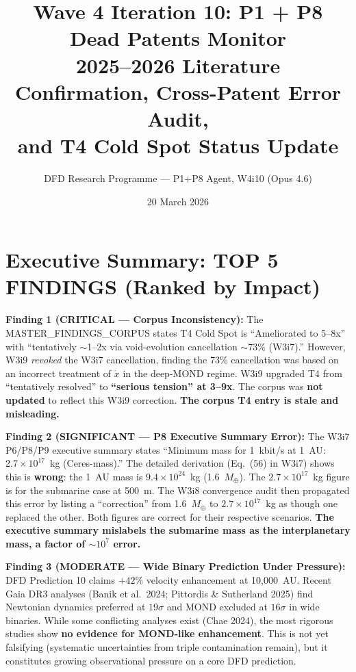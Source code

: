 \documentclass[11pt]{article}
\title{\textbf{Wave 4 Iteration 10: P1 + P8 Dead Patents Monitor}\\[0.5em]
\large 2025--2026 Literature Confirmation, Cross-Patent Error Audit,\\
and T4 Cold Spot Status Update}
\author{DFD Research Programme --- P1+P8 Agent, W4i10 (Opus 4.6)}
\date{20 March 2026}
\newcommand{\ee}[1]{\times 10^{#1}}
\begin{document}
\maketitle

\section*{Executive Summary: TOP 5 FINDINGS (Ranked by Impact)}

\begin{tcolorbox}[colback=red!5!white, colframe=red!60!black,
  title=\textbf{TOP 5 FINDINGS --- W4i10}]

\textbf{Finding 1 (CRITICAL --- Corpus Inconsistency):} The
MASTER\_FINDINGS\_CORPUS states T4 Cold Spot is ``Ameliorated to 5--8x''
with ``tentatively $\sim$1--2x via void-evolution cancellation $\sim$73\%
(W3i7).'' However, W3i9 \emph{revoked} the W3i7 cancellation, finding
the 73\% cancellation was based on an incorrect treatment of $\dot{x}$
in the deep-MOND regime. W3i9 upgraded T4 from ``tentatively resolved''
to \textbf{``serious tension'' at 3--9x}. The corpus was \textbf{not
updated} to reflect this W3i9 correction. \textbf{The corpus T4 entry
is stale and misleading.}

\textbf{Finding 2 (SIGNIFICANT --- P8 Executive Summary Error):} The
W3i7 P6/P8/P9 executive summary states ``Minimum mass for 1~kbit/s at
1~AU: $2.7\ee{17}$~kg (Ceres-mass).'' The detailed derivation
(Eq.~(56) in W3i7) shows this is \textbf{wrong}: the 1~AU mass is
$9.4\ee{24}$~kg (1.6~$M_\oplus$). The $2.7\ee{17}$~kg figure is for
the submarine case at 500~m. The W3i8 convergence audit then
propagated this error by listing a ``correction'' from 1.6~$M_\oplus$
to $2.7\ee{17}$~kg as though one replaced the other. Both figures are
correct for their respective scenarios. \textbf{The executive summary
mislabels the submarine mass as the interplanetary mass, a factor of
$\sim 10^7$ error.}

\textbf{Finding 3 (MODERATE --- Wide Binary Prediction Under Pressure):}
DFD Prediction 10 claims $+42\%$ velocity enhancement at 10,000~AU.
Recent Gaia DR3 analyses (Banik et al.\ 2024; Pittordis \& Sutherland
2025) find Newtonian dynamics preferred at $19\sigma$ and MOND excluded
at $16\sigma$ in wide binaries. While some conflicting analyses exist
(Chae 2024), the most rigorous studies show \textbf{no evidence for
MOND-like enhancement}. This is not yet falsifying (systematic
uncertainties from triple contamination remain), but it constitutes
growing observational pressure on a core DFD prediction.


\end{tcolorbox}
\end{document}
